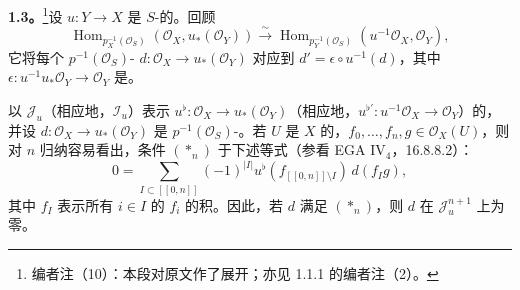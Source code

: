 \textbf{1.3。}\footnote{编者注（10）：本段对原文作了展开；亦见 1.1.1 的编者注（2）。}设 $u:Y\to X$ 是 $S$-的。回顾
\[
\operatorname{Hom}_{p_X^{-1}(\mathcal O_S)}(\mathcal O_X,u_*(\mathcal O_Y))\xrightarrow{\sim}\operatorname{Hom}_{p_Y^{-1}(\mathcal O_S)}(u^{-1}\mathcal O_X,\mathcal O_Y),
\]
它将每个 $p^{-1}(\mathcal O_S)$- $d:\mathcal O_X\to u_*(\mathcal O_Y)$ 对应到 $d'=\epsilon\circ u^{-1}(d)$，其中 $\epsilon:u^{-1}u_*\mathcal O_Y\to\mathcal O_Y$ 是。

以 $\mathcal J_u$（相应地，$\mathcal I_u$）表示 $u^\flat:\mathcal O_X\to u_*(\mathcal O_Y)$（相应地，$u^{\flat\prime}:u^{-1}\mathcal O_X\to\mathcal O_Y$）的，并设 $d:\mathcal O_X\to u_*(\mathcal O_Y)$ 是 $p^{-1}(\mathcal O_S)$-。若 $U$ 是 $X$ 的，$f_0,\ldots,f_n,g\in\mathcal O_X(U)$，则对 $n$ 归纳容易看出，条件 $(*_n)$ 于下述等式（参看 EGA IV$_4$，16.8.8.2）：
\[
0=\sum_{I\subset[\![0,n]\!]}(-1)^{|I|}u^\flat(f_{[\![0,n]\!]\setminus I})\,d(f_Ig),\tag{$**_n$}
\]
其中 $f_I$ 表示所有 $i\in I$ 的 $f_i$ 的积。因此，若 $d$ 满足 $(*_n)$，则 $d$ 在 $\mathcal J_u^{n+1}$ 上为零。

